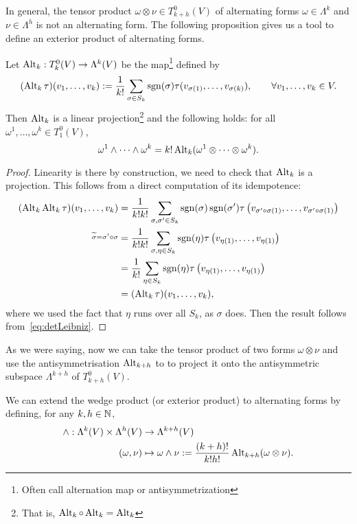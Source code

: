 In general, the tensor product $\omega\otimes\nu\in T_{k+h}^0(V)$ of alternating forms $\omega\in\Lambda^k$ and $\nu\in\Lambda^{h}$ is not an alternating form.
The following proposition gives us a tool to define an exterior product of alternating forms.

\begin{proposition}
  Let $\operatorname{Alt}_k: T_k^0(V)\to \Lambda^k(V)$ be the map\footnote{Often call alternation map or antisymmetrization} defined by
  \begin{equation}
    (\operatorname{Alt}_k\tau)(v_1,\ldots,v_k) := \frac1{k!} \sum_{\sigma\in S_k} \operatorname{sgn}(\sigma) \tau(v_{\sigma(1)}, \ldots, v_{\sigma(k)}),
    \qquad \forall v_1,\ldots,v_k \in V.
  \end{equation} 
  Then $\operatorname{Alt}_k$ is a linear projection\footnote{That is, $\operatorname{Alt}_k\circ\operatorname{Alt}_k = \operatorname{Alt}_k$} and the following holds:
  for all $\omega^1, \ldots, \omega^k \in T^0_1(V)$,
  \begin{equation}
    \omega^1 \wedge \cdots \wedge \omega^k = k! \operatorname{Alt}_k(\omega^1 \otimes \cdots \otimes \omega^k).
  \end{equation}
\end{proposition}
\begin{proof}
  Linearity is there by construction, we need to check that $\operatorname{Alt}_k$ is a projection.
  This follows from a direct computation of its idempotence:
  \begin{align}
    (\operatorname{Alt}_k \operatorname{Alt}_k \tau)(v_1,\ldots, v_k)
    &= \frac1{k!k!}\sum_{\sigma,\sigma'\in S_k}\operatorname{sgn}(\sigma)\operatorname{sgn}(\sigma') \tau\left(v_{\sigma'\circ\sigma(1)}, \ldots, v_{\sigma'\circ\sigma(1)}\right)\\
    \overset{\widetilde \sigma = \sigma'\circ\sigma}{}
    &=\frac1{k!k!}\sum_{\sigma,\eta\in S_k}\operatorname{sgn}(\eta) \tau\left(v_{\eta(1)}, \ldots, v_{\eta(1)}\right) \\
    &=\frac1{k!}\sum_{\eta\in S_k}\operatorname{sgn}(\eta) \tau\left(v_{\eta(1)}, \ldots, v_{\eta(1)}\right) \\
    &=(\operatorname{Alt}_k \tau)(v_1,\ldots, v_k),
  \end{align}
  where we used the fact that $\eta$ runs over all $S_k$, as $\sigma$ does.
  Then the result follows from~\eqref{eq:detLeibniz}.
\end{proof}

As we were saying, now we can take the tensor product of two forms $\omega\otimes\nu$ and use the antisymmetrisation $\operatorname{Alt}_{k+h}$ to to project it onto the antisymmetric subspace $\Lambda^{k+h}$ of $T_{k+h}^0(V)$.

\begin{definition}
  We can extend the wedge product (or exterior product) to alternating forms by defining, for any $k,h\in\mathbb{N}$,
  \begin{align}
    \wedge : \Lambda^k(V)\times\Lambda^h(V) &\to \Lambda^{k+h}(V)\\
    (\omega, \nu) &\mapsto \omega\wedge\nu := \frac{(k+h)!}{k!h!} \operatorname{Alt}_{k+h}(\omega\otimes\nu).
  \end{align}
\end{definition}


